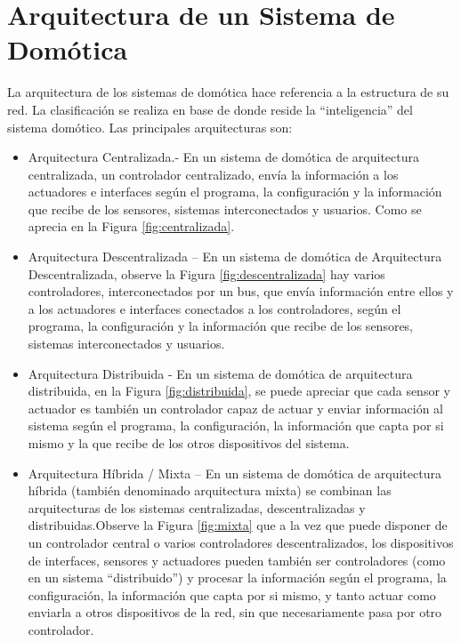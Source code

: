 \documentclass[11pt,letterpaper]{report}
\begin{document}
		\section{Arquitectura de un Sistema de Domótica }
		La arquitectura de los sistemas de domótica hace referencia a la estructura de su red. La clasificación se realiza en base de donde reside la “inteligencia” del sistema domótico\citep{Pedro2009}. Las principales arquitecturas son: 
		\begin{itemize}
		\item Arquitectura Centralizada.- En un sistema de domótica de arquitectura centralizada, un controlador centralizado, envía la información a los actuadores e interfaces según el programa, la configuración y la información que recibe de los sensores, sistemas interconectados y usuarios. Como se aprecia en la Figura \ref{fig:centralizada}.
		\item Arquitectura Descentralizada – En un sistema de domótica de Arquitectura Descentralizada, observe la Figura \ref{fig:descentralizada} hay varios controladores, interconectados por un bus, que envía información entre ellos y a los actuadores e interfaces conectados a los controladores, según el programa, la configuración y la información que recibe de los sensores, sistemas interconectados y usuarios.  
		\item Arquitectura Distribuida - En un sistema de domótica de arquitectura distribuida, en la Figura \ref{fig:distribuida}, se puede apreciar que  cada sensor y actuador es también un controlador capaz de actuar y enviar información al sistema según el programa, la configuración, la información que capta por si mismo y la que recibe de los otros dispositivos del sistema.
		\item Arquitectura Híbrida / Mixta – En un sistema de domótica de arquitectura híbrida (también denominado arquitectura mixta) se combinan las arquitecturas de los sistemas centralizadas, descentralizadas y distribuidas.Observe la Figura \ref{fig:mixta} que a la vez que puede disponer de un controlador central o varios controladores descentralizados, los dispositivos de interfaces, sensores y actuadores pueden también ser controladores (como en un sistema “distribuido”) y procesar la información según el programa, la configuración, la información que capta por si mismo, y tanto actuar como enviarla a otros dispositivos de la red, sin que necesariamente pasa por otro controlador.			
		\end{itemize}
\end{document}
